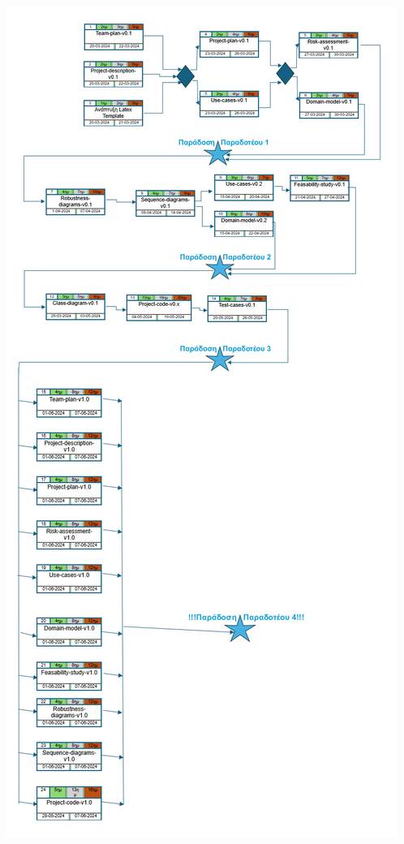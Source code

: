 \documentclass{article}
\begin{document}
\begin{center}
    \includegraphics[scale=0.52]{pertteam.png}
\end{center}
\end{document}
